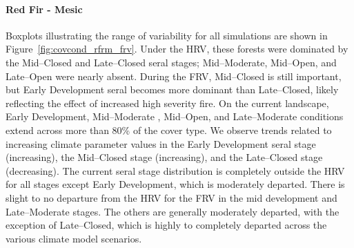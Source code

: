 \paragraph*{Red Fir - Mesic} 
Boxplots illustrating the range of variability for all simulations are shown in Figure~\ref{fig:covcond_rfrm_frv}. Under the HRV, these forests were dominated by the Mid--Closed and Late--Closed seral stages; Mid--Moderate, Mid--Open, and Late--Open were nearly absent. During the FRV, Mid--Closed is still important, but Early Development seral becomes more dominant than Late--Closed, likely reflecting the effect of increased high severity fire. On the current landscape, Early Development, Mid--Moderate , Mid--Open, and Late--Moderate conditions extend across more than 80\% of the cover type. We observe trends related to increasing climate parameter values in the Early Development seral stage (increasing), the Mid--Closed stage (increasing), and the Late--Closed stage (decreasing). The current seral stage distribution is completely outside the HRV for all stages except Early Development, which is moderately departed. There is slight to no departure from the HRV for the FRV in the mid development and Late--Moderate stages. The others are generally moderately departed, with the exception of Late--Closed, which is highly to completely departed across the various climate model scenarios.


